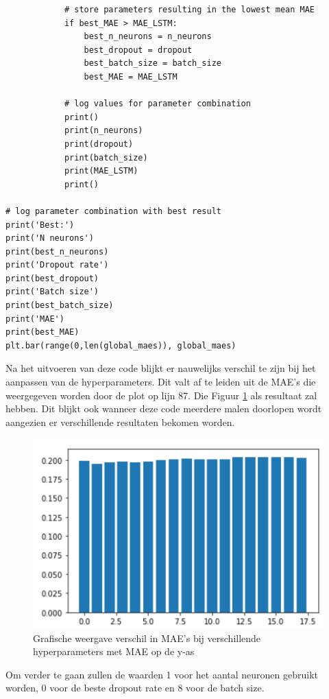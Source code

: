 \begin{verbatim}
            # store parameters resulting in the lowest mean MAE
            if best_MAE > MAE_LSTM:
                best_n_neurons = n_neurons
                best_dropout = dropout
                best_batch_size = batch_size
                best_MAE = MAE_LSTM
            
            # log values for parameter combination
            print()
            print(n_neurons)
            print(dropout)
            print(batch_size)
            print(MAE_LSTM)
            print()    

# log parameter combination with best result
print('Best:')
print('N neurons')
print(best_n_neurons)
print('Dropout rate')
print(best_dropout)
print('Batch size')
print(best_batch_size)
print('MAE')
print(best_MAE)
plt.bar(range(0,len(global_maes)), global_maes)
\end{verbatim}

Na het uitvoeren van deze code blijkt er nauwelijks verschil te zijn bij het aanpassen van de hyperparameters. Dit valt af te leiden uit de MAE's die weergegeven worden door de plot op lijn 87. Die Figuur \ref{fig:uvnslstmbar} als resultaat zal hebben.
Dit blijkt ook wanneer deze code meerdere malen doorlopen wordt aangezien er verschillende resultaten bekomen worden.

\begin{figure}[!h]
    \centering
    \caption{Grafische weergave verschil in MAE's bij verschillende hyperparameters met MAE op de y-as}
    \label{fig:uvnslstmbar}
    \includegraphics[width=0.7\linewidth]{uv_ns_LSTM_bar}
\end{figure}

Om verder te gaan zullen de waarden 1 voor het aantal neuronen gebruikt worden, 0 voor de beste dropout rate en 8 voor de batch size. 

